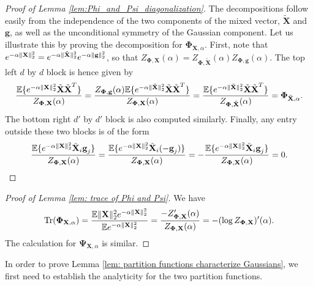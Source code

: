 \documentclass[final,12pt]{colt2018} %
\numberwithin{equation}{section}
\DeclarePairedDelimiter{\norm}{\lVert}{\rVert}
\DeclarePairedDelimiter{\paren}{(}{)}
\DeclarePairedDelimiter{\braces}{\lbrace}{\rbrace}
\newcommand{\E}{\mathbb{E}}
\newcommand{\boldg}{\textbf{g}}
\newcommand{\boldPhi}{\boldsymbol{\Phi}}
\newcommand{\boldPsi}{\boldsymbol{\Psi}}
\newcommand{\boldX}{\textbf{X}}
\begin{document}
\begin{proof}[Proof of Lemma \ref{lem:Phi_and_Psi_diagonalization}]
	The decompositions follow easily from the independence of the two components of the mixed vector, $\tilde{\boldX}$ and $\boldg$, as well as the unconditional symmetry of the Gaussian component. Let us illustrate this by proving the decomposition for $\boldPhi_{\boldX,\alpha}$. First, note that $e^{-\alpha\norm{\boldX}_2^2} = e^{-\alpha\norm{\tilde{\boldX}}_2^2}e^{-\alpha\norm{\boldg}_2^2}$, so that $Z_{\boldPhi,\boldX}(\alpha) = Z_{\boldPhi,\tilde{\boldX}}(\alpha)Z_{\boldPhi,\boldg}(\alpha)$. The top left $d$ by $d$ block is hence given by
	\[
	\frac{\E\braces{e^{-\alpha\norm{\boldX}_2^2}\tilde{\boldX}\tilde{\boldX}^T}}{Z_{\boldPhi,\boldX}(\alpha)} = \frac{Z_{\boldPhi,\boldg}(\alpha)\E\braces{e^{-\alpha\norm{\tilde{\boldX}}_2^2}\tilde{\boldX}\tilde{\boldX}^T}}{Z_{\boldPhi,\boldX}(\alpha)} = \frac{\E\braces{e^{-\alpha\norm{\tilde{\boldX}}_2^2}\tilde{\boldX}\tilde{\boldX}^T}}{Z_{\boldPhi,\tilde{\boldX}}(\alpha)} = \boldPhi_{\tilde{\boldX},\alpha}.
	\]
	The bottom right $d'$ by $d'$ block is also computed similarly. Finally, any entry outside these two blocks is of the form
	\begin{equation*}
	\frac{\E\braces{e^{-\alpha\norm{\boldX}_2^2}\tilde{\boldX}_i\boldg_j}}{Z_{\boldPhi,\boldX}(\alpha)} = \frac{\E\braces{e^{-\alpha\norm{\boldX}_2^2}\tilde{\boldX}_i(-\boldg_j)}}{Z_{\boldPhi,\boldX}(\alpha)} = -\frac{\E\braces{e^{-\alpha\norm{\boldX}_2^2}\tilde{\boldX}_i\boldg_j}}{Z_{\boldPhi,\boldX}(\alpha)} = 0.
	\end{equation*}
\end{proof}

\begin{proof}[Proof of Lemma \ref{lem: trace of Phi and Psi}]
	We have
	$$
	\textnormal{Tr}\paren{\boldPhi_{\boldX,\alpha}} = \frac{\E\norm{\boldX}_2^2e^{-\alpha\norm{\boldX}_2^2}}{\E e^{-\alpha\norm{\boldX}_2^2}} = \frac{-Z_{\boldPhi,\boldX}'(\alpha)}{Z_{\boldPhi,\boldX}(\alpha)} = -(\log Z_{\boldPhi,\boldX})'(\alpha).
	$$
	The calculation for $\boldPsi_{\boldX,\alpha}$ is similar.
\end{proof}

In order to prove Lemma \ref{lem: partition functions characterize Gaussians}, we first need to establish the analyticity for the two partition functions.
\end{document}
